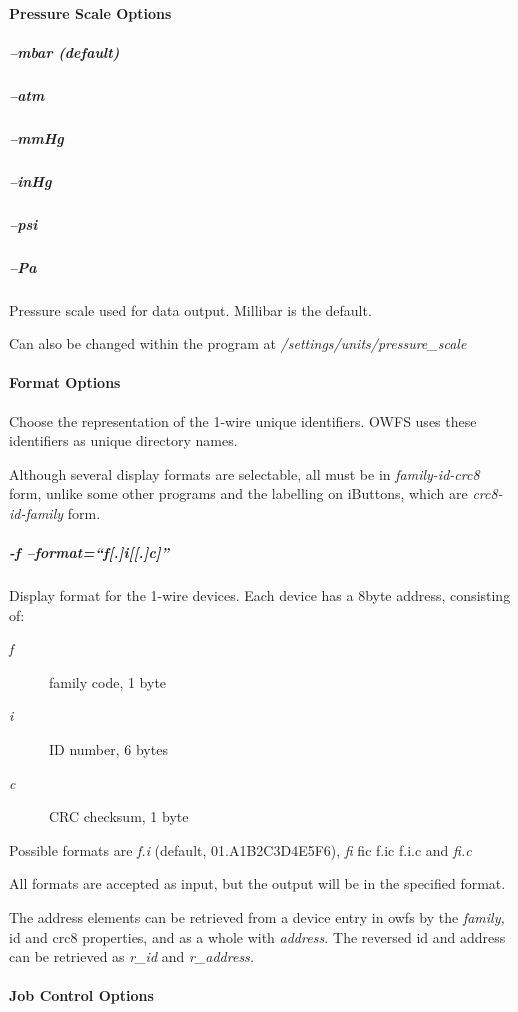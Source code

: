 \paragraph*{Pressure Scale Options}

\subparagraph*{--mbar (default)}
\subparagraph*{--atm}
\subparagraph*{--mmHg}
\subparagraph*{--inHg}
\subparagraph*{--psi}
\subparagraph*{--Pa}Pressure
scale used for data output. Millibar is the default. 

Can also be changed
within the program at \textit{/settings/units/pressure\_scale}             
\paragraph*{Format
Options}
Choose the representation of the 1-wire unique identifiers. OWFS uses
these identifiers as unique directory names. 

Although several display formats
are selectable, all must be in  \textit{family-id-crc8} form, unlike some other programs
and the labelling on iButtons, which are \textit{crc8-id-family} form. 
\subparagraph*{-f --format=``f[.]i[[.]c]''}Display
format for the 1-wire devices. Each device has a 8byte address, consisting
of: \begin{description}
\item [\textit{f} ] family code, 1 byte 
\item [\textit{i} ] ID number, 6 bytes 
\item [\textit{c} ] CRC checksum, 1 byte 
\end{description}


Possible
formats are \textit{f.i} (default, 01.A1B2C3D4E5F6), \textit{fi} fic f.ic f.i.c and \textit{fi.c} 

All formats
are accepted as input, but the output will be in the specified format. 

The
address elements can be retrieved from a device entry in owfs by the  \textit{family,}
id and crc8 properties, and as a whole with \textit{address.} The reversed id and
address can be retrieved as \textit{r\_id} and  \textit{r\_address.}            
\paragraph*{Job Control
Options}

